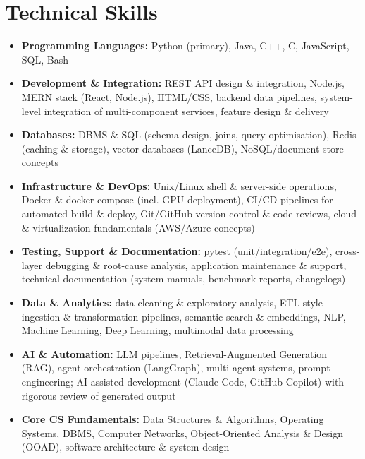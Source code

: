 \documentclass[10pt,a4paper]{article}
\begin{document}
\section{Technical Skills}
{\small
\begin{itemize}
\item \textbf{Programming Languages:} Python (primary), Java, C++, C, JavaScript, SQL, Bash
\item \textbf{Development \& Integration:} REST API design \& integration, Node.js, MERN stack (React, Node.js), HTML/CSS, backend data pipelines, system-level integration of multi-component services, feature design \& delivery
\item \textbf{Databases:} DBMS \& SQL (schema design, joins, query optimisation), Redis (caching \& storage), vector databases (LanceDB), NoSQL/document-store concepts
\item \textbf{Infrastructure \& DevOps:} Unix/Linux shell \& server-side operations, Docker \& docker-compose (incl. GPU deployment), CI/CD pipelines for automated build \& deploy, Git/GitHub version control \& code reviews, cloud \& virtualization fundamentals (AWS/Azure concepts)
\item \textbf{Testing, Support \& Documentation:} pytest (unit/integration/e2e), cross-layer debugging \& root-cause analysis, application maintenance \& support, technical documentation (system manuals, benchmark reports, changelogs)
\item \textbf{Data \& Analytics:} data cleaning \& exploratory analysis, ETL-style ingestion \& transformation pipelines, semantic search \& embeddings, NLP, Machine Learning, Deep Learning, multimodal data processing
\item \textbf{AI \& Automation:} LLM pipelines, Retrieval-Augmented Generation (RAG), agent orchestration (LangGraph), multi-agent systems, prompt engineering; AI-assisted development (Claude Code, GitHub Copilot) with rigorous review of generated output
\item \textbf{Core CS Fundamentals:} Data Structures \& Algorithms, Operating Systems, DBMS, Computer Networks, Object-Oriented Analysis \& Design (OOAD), software architecture \& system design
\end{itemize}}
\end{document}
